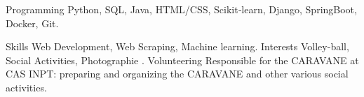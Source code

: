 

\begin{cvskills}

  \cvskill
    {Programming} %
    {Python, SQL, Java, HTML/CSS, Scikit‑learn, Django, SpringBoot, Docker, Git.} %

  \cvskill
    {Skills} %
    {Web Development, Web Scraping, Machine learning.} %
  \cvskill
    {Interests} %
    {Volley-ball, Social Activities, Photographie .} %
  \cvskill
    {Volunteering} %
    {Responsible for the CARAVANE at CAS INPT: preparing and organizing the CARAVANE and other various social activities.}%

\end{cvskills}
